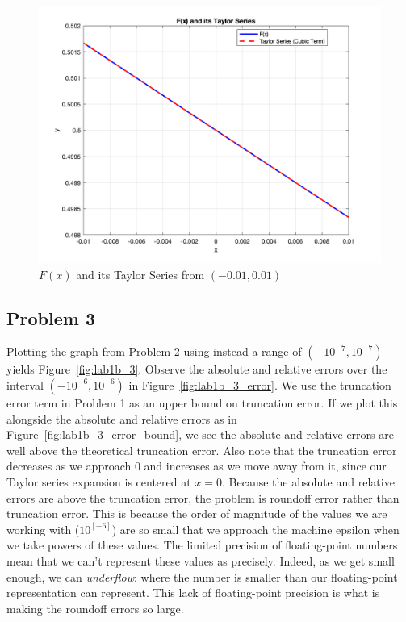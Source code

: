 \documentclass[letter,11pt]{article}
\begin{document}
\begin{figure}[h]
  \centering
  \includegraphics[width=0.8\linewidth]{lab1b_2.png}
  \caption{$F(x)$ and its Taylor Series from $(-0.01, 0.01)$}
  \label{fig:lab1b_2}
\end{figure}

\subsection{Problem 3}

Plotting the graph from Problem 2 using instead a range of $(-10^{-7}, 10^{-7})$ yields Figure~\ref{fig:lab1b_3}. Observe the absolute and relative errors over the interval $(-10^{-6}, 10^{-6})$ in Figure~\ref{fig:lab1b_3_error}. We use the truncation error term in Problem 1 as an upper bound on truncation error. If we plot this alongside the absolute and relative errors as in Figure~\ref{fig:lab1b_3_error_bound}, we see the absolute and relative errors are well above the theoretical truncation error. Also note that the truncation error decreases as we approach 0 and increases as we move away from it, since our Taylor series expansion is centered at $x = 0$. Because the absolute and relative errors are above the truncation error, the problem is roundoff error rather than truncation error. This is because the order of magnitude of the values we are working with ($10^[-6]$) are so small that we approach the machine epsilon when we take powers of these values. The limited precision of floating-point numbers mean that we can't represent these values as precisely. Indeed, as we get small enough, we can \textit{underflow}: where the number is smaller than our floating-point representation can represent. This lack of floating-point precision is what is making the roundoff errors so large.
\end{document}
